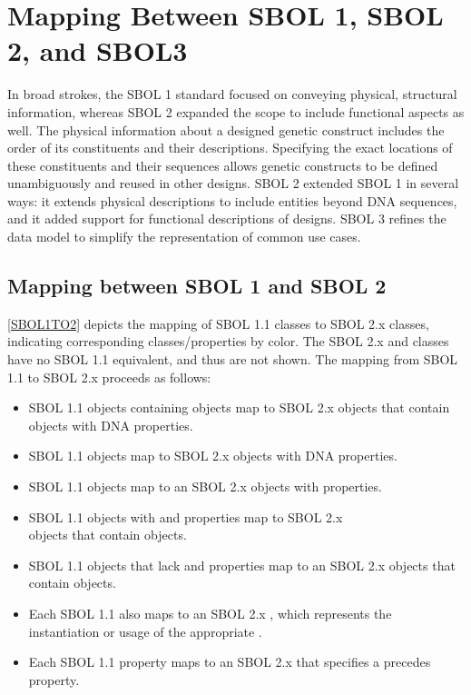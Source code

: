 \section{Mapping Between SBOL 1, SBOL 2, and SBOL3}
\label{sec:mapping}

In broad strokes, the SBOL 1 standard focused on conveying physical, structural information, whereas SBOL 2 expanded the scope to include functional aspects as well.  
The physical information about a designed genetic construct includes the order of its constituents and their descriptions. 
Specifying the exact locations of these constituents and their sequences allows genetic constructs to be defined unambiguously and reused in other designs. 
SBOL 2 extended SBOL 1 in several ways: it extends physical descriptions to include entities beyond DNA sequences, and it added support for functional descriptions of designs.  
SBOL 3 refines the data model to simplify the representation of common use cases.

\subsection{Mapping between SBOL 1 and SBOL 2}

\ref{SBOL1TO2} depicts the mapping of SBOL 1.1 classes to SBOL 2.x classes, indicating corresponding classes/properties by color.
The SBOL 2.x  and  classes have no SBOL 1.1 equivalent, and thus are not shown.
The mapping from SBOL 1.1 to SBOL 2.x proceeds as follows:
\begin{itemize}
\item SBOL 1.1  objects containing  objects map to SBOL 2.x  objects that contain  objects with DNA  properties.
\item SBOL 1.1  objects map to SBOL 2.x  objects with DNA  properties.
\item SBOL 1.1  objects map to an SBOL 2.x  objects with   properties.
\item SBOL 1.1  objects with  and  properties map to SBOL 2.x\\
 objects that contain  objects.
\item SBOL 1.1  objects that lack  and  properties map to an SBOL 2.x  objects that contain  objects.
\item Each SBOL 1.1  also maps to an SBOL 2.x , which represents the instantiation or usage of the appropriate .
\item Each SBOL 1.1  property maps to an SBOL 2.x  that specifies a precedes  property.
\end{itemize}

